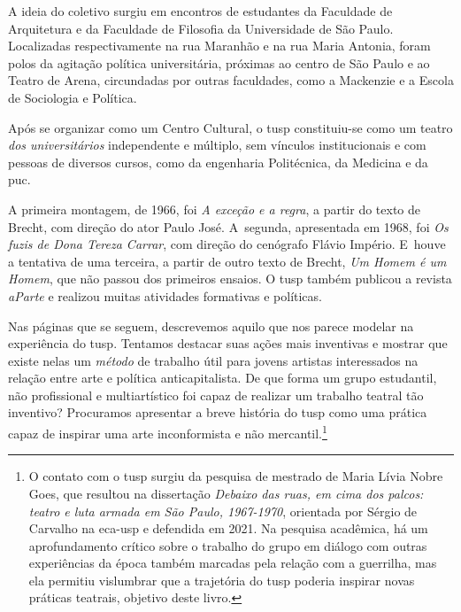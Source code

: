 A ideia do coletivo surgiu em encontros de estudantes da
Faculdade de Arquitetura e da Faculdade de Filosofia da
Universidade de São Paulo. Localizadas respectivamente na rua Maranhão e
na rua Maria Antonia, foram polos da agitação política universitária,
próximas ao centro de São Paulo e ao Teatro de Arena, circundadas por
outras faculdades, como a Mackenzie e a Escola de Sociologia e Política.

Após se organizar como um Centro Cultural, o {\sc tusp} constituiu-se como um
teatro {\it dos universitários} independente e múltiplo, sem vínculos
institucionais e com pessoas de diversos cursos, como da engenharia
Politécnica, da Medicina e da {\sc puc}.


A primeira montagem, de 1966, foi {\it A exceção e a regra}, a partir do
texto de Brecht, com direção do ator Paulo José. A~segunda, apresentada
em 1968, foi {\it Os fuzis de Dona Tereza Carrar}, com direção do
cenógrafo Flávio Império. E~houve a tentativa de uma terceira, a partir
de outro texto de Brecht, {\it Um Homem é um Homem}, que não passou dos
primeiros ensaios. O {\sc tusp} também publicou a revista {\it aParte} e realizou
muitas atividades formativas e políticas.

Nas páginas que se seguem, descrevemos aquilo que nos parece modelar na
experiência do {\sc tusp}. Tentamos destacar suas ações mais inventivas e
mostrar que existe nelas um {\it método} de trabalho útil para jovens
artistas interessados na relação entre arte e política anticapitalista.
De que forma um grupo estudantil, não profissional e multiartístico foi
capaz de realizar um trabalho teatral tão inventivo? Procuramos
apresentar a breve história do {\sc tusp} como uma prática capaz de inspirar
uma arte inconformista e não mercantil.\footnote{O contato com o
  {\sc tusp} surgiu da pesquisa de mestrado de Maria Lívia Nobre Goes, que
  resultou na dissertação {\it Debaixo das ruas, em cima dos palcos:
  teatro e luta armada em São Paulo, 1967-1970}, orientada por Sérgio de
  Carvalho na {\sc eca-usp} e defendida em 2021. Na pesquisa acadêmica, há um
  aprofundamento crítico sobre o trabalho do grupo em diálogo com outras
  experiências da época também marcadas pela relação com a guerrilha,
  mas ela permitiu vislumbrar que a trajetória do {\sc tusp} poderia inspirar
  novas práticas teatrais, objetivo deste livro.}

